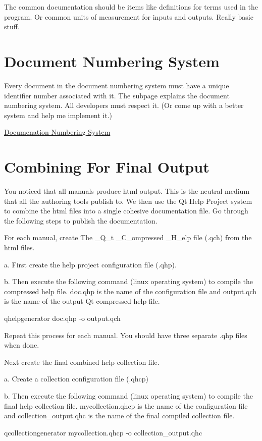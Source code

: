 The common documentation should be items like definitions for terms used in the program. Or common units of measurement for inputs and outputs. Really basic stuff.

\section*{Document Numbering System}

Every document in the document numbering system must have a unique identifier number associated with it. The subpage explains the document numbering system. All developers must respect it. (Or come up with a better system and help me implement it.)

\hyperlink{docnumbersys}{Documenation Numbering System}\hypertarget{documentation_documentation_combine}{}\section{Combining For Final Output}\label{documentation_documentation_combine}
You noticed that all manuals produce html output. This is the neutral medium that all the authoring tools publish to. We then use the Qt Help Project system to combine the html files into a single cohesive documentation file. Go through the following steps to publish the documentation.


\begin{DoxyEnumerate}
\item For each manual, create The \-\_\-\-Q\-\_\-t \-\_\-\-C\-\_\-ompressed \-\_\-\-H\-\_\-elp file (.qch) from the html files.

a. First create the help project configuration file (.qhp).

b. Then execute the following command (linux operating system) to compile the compressed help file. doc.\-qhp is the name of the configuration file and output.\-qch is the name of the output Qt compressed help file. \begin{DoxyVerb}qhelpgenerator doc.qhp -o output.qch
\end{DoxyVerb}

\end{DoxyEnumerate}


\begin{DoxyEnumerate}
\item Repeat this process for each manual. You should have three separate .qhp files when done.
\item Next create the final combined help collection file.

a. Create a collection configuration file (.qhcp)

b. Then execute the following command (linux operating system) to compile the final help collection file. mycollection.\-qhcp is the name of the configuration file and collection\-\_\-output.\-qhc is the name of the final compiled collection file. \begin{DoxyVerb}qcollectiongenerator mycollection.qhcp -o collection_output.qhc
\end{DoxyVerb}

\end{DoxyEnumerate}


